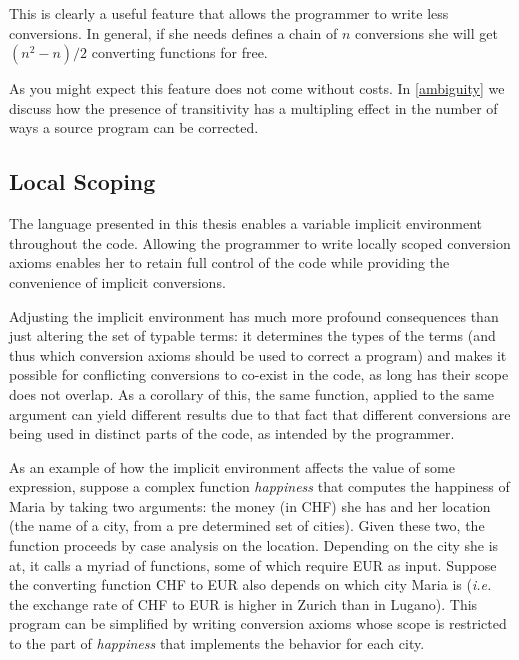 This is clearly a useful feature that allows the programmer to write less conversions. In general, if she needs defines a chain of $n$ conversions she will get $(n^2-n)/2$ converting functions for free.

As you might expect this feature does not come without costs. In \ref{ambiguity} we discuss how the presence of transitivity has a multipling effect in the number of ways a source program can be corrected.


\subsection{Local Scoping}
The language presented in this thesis enables a variable implicit environment throughout the code. Allowing the programmer to write locally scoped conversion axioms enables her to retain full control of the code while providing the convenience of implicit conversions. 

Adjusting the implicit environment has much more profound consequences than just altering the set of typable terms: it determines the types of the terms (and thus which conversion axioms should be used to correct a program) and makes it possible for conflicting conversions to co-exist in the code, as long has their scope does not overlap. As a corollary of this, the same function, applied to the same argument can yield different results due to that fact that different conversions are being used in distinct parts of the code, as intended by the programmer.

As an example of how the implicit environment affects the value of some expression, suppose a complex function \textit{happiness} that computes the happiness of Maria by taking two arguments: the money (in CHF) she has and her location (the name of a city, from a pre determined set of cities). Given these two, the function proceeds by case analysis on the location. Depending on the city she is at, it calls a myriad of functions, some of which require EUR as input. Suppose the converting function CHF to EUR also depends on which city Maria is (\textit{i.e.} the exchange rate of CHF to EUR is higher in Zurich than in Lugano). This program can be simplified by writing conversion axioms whose scope is restricted to the part of \textit{happiness} that implements the behavior for each city.


